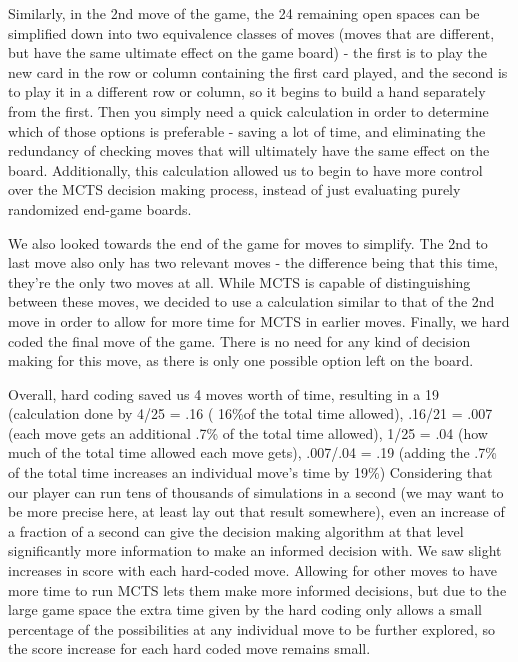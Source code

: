 \documentclass[letterpaper]{article}
\begin{document}
Similarly, in the 2nd move of the game, the 24 remaining open spaces can be simplified down into two equivalence classes of moves (moves that are different, but have the same ultimate effect on the game board) - the first is to play the new card in the row or column containing the first card played, and the second is to play it in a different row or column, so it begins to build a hand separately from the first. Then you simply need a quick calculation in order to determine which of those options is preferable - saving a lot of time, and eliminating the redundancy of checking moves that will ultimately have the same effect on the board. Additionally, this calculation allowed us to begin to have more control over the MCTS decision making process, instead of just evaluating purely randomized end-game boards.

We also looked towards the end of the game for moves to simplify. The 2nd to last move also only has two relevant moves - the difference being that this time, they’re the only two moves at all. While MCTS is capable of distinguishing between these moves, we decided to use a calculation similar to that of the 2nd move in order to allow for more time for MCTS in earlier moves.
Finally, we hard coded the final move of the game. There is no need for any kind of decision making for this move, as there is only one possible option left on the board.

Overall, hard coding saved us 4 moves worth of time, resulting in a 19%
	(calculation done by 4/25 = .16 ( 16\%of the total time allowed), .16/21 = .007 (each move gets an additional .7\% of the total time allowed), 1/25 = .04 (how much of the total time allowed each move gets), .007/.04 = .19 (adding the .7\% of the total time increases an individual move’s time by 19\%)
Considering that our player can run tens of thousands of simulations in a second (we may want to be more precise here, at least lay out that result somewhere), even an increase of a fraction of a second can give the decision making algorithm at that level significantly more information to make an informed decision with.
We saw slight increases in score with each hard-coded move. Allowing for other moves to have more time to run MCTS lets them make more informed decisions, but due to the large game space the extra time given by the hard coding only allows a small percentage of the possibilities at any individual move to be further explored, so the score increase for each hard coded move remains small.
\end{document}
